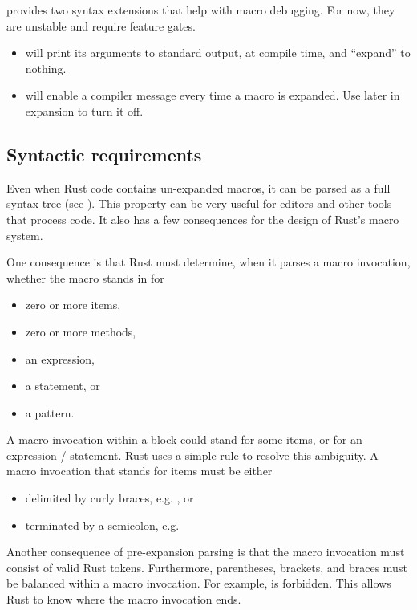 \blank

 provides two syntax extensions that help with macro debugging. For now, they are unstable and require feature gates.

\begin{itemize}
  \item{ will print its arguments to standard output, at compile time, and \enquote{expand} to nothing.}
  \item{ will enable a compiler message every time a macro is expanded. Use  
      later in expansion to turn it off.}
\end{itemize}

\subsection*{Syntactic requirements}

Even when Rust code contains un-expanded macros, it can be parsed as a full syntax tree (see ). This 
property can be very useful for editors and other tools that process code. It also has a few consequences for the design of Rust's macro 
system.

\blank

One consequence is that Rust must determine, when it parses a macro invocation, whether the macro stands in for

\begin{itemize}
  \item{zero or more items,}
  \item{zero or more methods,}
  \item{an expression,}
  \item{a statement, or}
  \item{a pattern.}
\end{itemize}

A macro invocation within a block could stand for some items, or for an expression / statement. Rust uses a simple rule to resolve 
this ambiguity. A macro invocation that stands for items must be either

\begin{itemize}
  \item{delimited by curly braces, e.g. , or}
  \item{terminated by a semicolon, e.g. }
\end{itemize}

Another consequence of pre-expansion parsing is that the macro invocation must consist of valid Rust tokens. Furthermore, parentheses, 
brackets, and braces must be balanced within a macro invocation. For example, \code{foo!([)} is forbidden. This allows Rust to know 
where the macro invocation ends.

